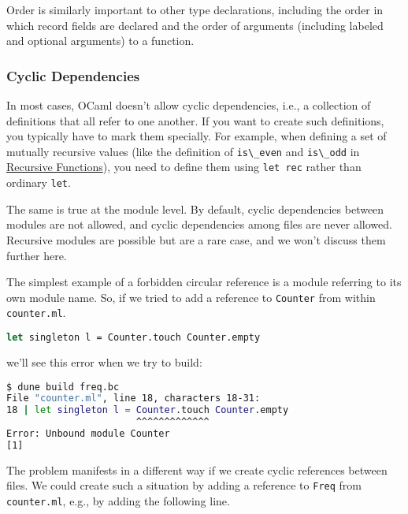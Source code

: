 Order is similarly important to other type declarations, including the
order in which record fields are declared and the order of arguments
(including labeled and optional arguments) to a function.

\hypertarget{cyclic-dependencies}{%
\subsubsection{Cyclic Dependencies}\label{cyclic-dependencies}}

In most cases, OCaml doesn't allow cyclic dependencies, i.e., a
collection of definitions that all refer to one another. If you want to
create such definitions, you typically have to mark them specially. For
example, when defining a set of mutually recursive values (like the
definition of \passthrough{\lstinline!is\_even!} and
\passthrough{\lstinline!is\_odd!} in
\href{variables-and-functions.html\#recursive-functions}{Recursive
Functions}), you need to define them using
\passthrough{\lstinline!let rec!} rather than ordinary
\passthrough{\lstinline!let!}.

The same is true at the module level. By default, cyclic dependencies
between modules are not allowed, and cyclic dependencies among files are
never allowed. Recursive modules are possible but are a rare case, and
we won't discuss them further here.

The simplest example of a forbidden circular reference is a module
referring to its own module name. So, if we tried to add a reference to
\passthrough{\lstinline!Counter!} from within
\passthrough{\lstinline!counter.ml!}.

\begin{lstlisting}[language=Caml]
let singleton l = Counter.touch Counter.empty
\end{lstlisting}

we'll see this error when we try to build:

\begin{lstlisting}[language=bash]
$ dune build freq.bc
File "counter.ml", line 18, characters 18-31:
18 | let singleton l = Counter.touch Counter.empty
                       ^^^^^^^^^^^^^
Error: Unbound module Counter
[1]
\end{lstlisting}

The problem manifests in a different way if we create cyclic references
between files. We could create such a situation by adding a reference to
\passthrough{\lstinline!Freq!} from
\passthrough{\lstinline!counter.ml!}, e.g., by adding the following
line.


